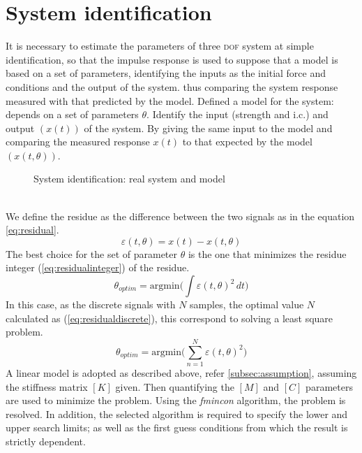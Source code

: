 \section{System identification}
\label{sec:sysidentification}
It is necessary to estimate the parameters of three \textsc{dof} system at simple 
identification, so that the impulse response is used to suppose that a model is 
based on a set of parameters, identifying the inputs as the initial force and 
conditions and the output of the system.
thus comparing the system response measured with that predicted by the model.
Defined a model for the system: depends on a set of parameters $\theta$. 
Identify the input (strength and i.c.) and output $(x(t))$ of the system. 
By giving the same input to the model and comparing the measured response $x(t)$ 
to that expected by the model $(x(t,\theta))$.
%
\begin{figure}[htb]
	\centering
	\resizebox{.50\linewidth}{!}{}
	\label{fig:systemmodel}
	\caption{System identification: real system and model}
\end{figure}
%
\\We define the residue as the difference between the two signals as in the 
equation \eqref{eq:residual}.
\begin{equation}
\label{eq:residual}
	\varepsilon(t,\theta) = x(t) - x(t,\theta)
\end{equation} 
The best choice for the set of parameter $\theta$ is the one that minimizes the 
residue integer (\ref{eq:residualinteger}) of the residue. 
\begin{equation}
\label{eq:residualinteger}
	\theta_{optim} = \text{argmin} \biggl( \int \varepsilon(t,\theta)^2 \, dt \biggr)
\end{equation} 
In this case, as the discrete signals with $N$ samples, the optimal value $N$ 
calculated as (\ref{eq:residualdiscrete}), this correspond to solving a least 
square problem.
\begin{equation}
\label{eq:residualdiscrete} 
\theta_{optim} = \text{argmin} \Biggl( \sum_{n=1}^{N} \varepsilon(t,\theta)^2 \Biggr)
\end{equation}
%
A linear model is adopted as described above, refer \ref{subsec:assumption}, 
assuming the stiffness matrix $[K]$ given.
Then quantifying the $[M]$ and $[C]$ parameters are used to minimize the problem.
Using the \emph{fmincon} algorithm, the problem is resolved. In addition, the 
selected algorithm is required to specify the lower and upper search limits; 
as well as the first guess conditions from which the result is strictly dependent.
%
